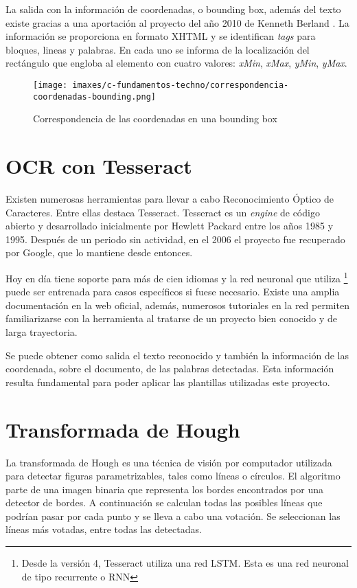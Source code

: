 La salida con la información de coordenadas, o bounding box, además del texto existe gracias a una aportación al proyecto del año 2010 de Kenneth Berland \cite{kenneth_berland_poppler_2010}. La información se proporciona en formato XHTML y se identifican \emph{tags} para bloques, lineas y palabras. En cada uno se informa de la localización del rectángulo que engloba al elemento con cuatro valores: \emph{xMin}, \emph{xMax}, \emph{yMin}, \emph{yMax}.

\begin{figure}[hp!]
	\centering
	\texttt{[image: imaxes/c-fundamentos-techno/correspondencia-coordenadas-bounding.png]}
	\caption{Correspondencia de las coordenadas en una bounding box}
	\label{fig:bounding-box}
\end{figure}

\section{OCR con Tesseract}

Existen numerosas herramientas para llevar a cabo Reconocimiento Óptico de Caracteres. Entre ellas destaca Tesseract. Tesseract es un \emph{engine} de código abierto y desarrollado inicialmente por Hewlett Packard entre los años 1985 y 1995. Después de un periodo sin actividad, en el 2006 el proyecto fue recuperado por Google, que lo mantiene desde entonces.

Hoy en día tiene soporte para más de cien idiomas y la red neuronal que utiliza \footnote{Desde la versión 4, Tesseract utiliza una red LSTM. Esta es una red neuronal de tipo recurrente o RNN} puede ser entrenada para casos específicos si fuese necesario. Existe una amplia documentación en la web oficial, además, numerosos tutoriales en la red permiten familiarizarse con la herramienta al tratarse de un proyecto bien conocido y de larga trayectoria.

Se puede obtener como salida el texto reconocido y también la información de las coordenada, sobre el documento, de las palabras detectadas. Esta información resulta fundamental para poder aplicar las plantillas utilizadas este proyecto.

\section{Transformada de Hough}

La transformada de Hough es una técnica de visión por computador utilizada para detectar figuras parametrizables, tales como líneas o círculos. El algoritmo parte de una imagen binaria que representa los bordes encontrados por una detector de bordes. A continuación se calculan todas las posibles líneas que podrían pasar por cada punto y se lleva a cabo una votación. Se seleccionan las líneas más votadas, entre todas las detectadas.

